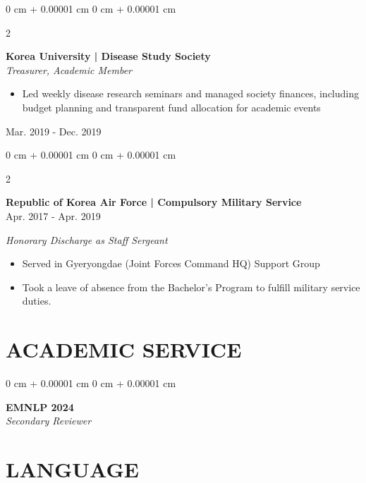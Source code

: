 \documentclass[10pt, letterpaper]{article}
\newenvironment{highlights}{
    \begin{itemize}[
        topsep=0.10 cm,
        parsep=0.10 cm,
        partopsep=0pt,
        itemsep=0pt,
        leftmargin=0 cm + 10pt
    ]
}{
    \end{itemize}
} %
\newenvironment{onecolentry}{
    \begin{adjustwidth}{
        0 cm + 0.00001 cm
    }{
        0 cm + 0.00001 cm
    }
}{
    \end{adjustwidth}
} %
\newenvironment{twocolentry}[2][]{
    \onecolentry
    \def\secondColumn{#2}
    \setcolumnwidth{\fill, 3.5 cm}
    \begin{paracol}{2}
}{
    \switchcolumn \raggedleft \secondColumn
    \end{paracol}
    \endonecolentry
} %
\begin{document}
        \begin{twocolentry}{
            Mar. 2019 - Dec. 2019\\ 
        }
        \textbf{Korea University | Disease Study Society}\\
\textit{Treasurer, Academic Member}
\begin{highlights}
    \item Led weekly disease research seminars and managed society finances, including budget planning and transparent fund allocation for academic events
\end{highlights}
        \end{twocolentry}
         \vspace{0.05 cm}
        \begin{twocolentry}{
            Apr. 2017 - Apr. 2019\\ 
        }
        \textbf{Republic of Korea Air Force | Compulsory Military Service}\\
        \end{twocolentry}
        \textit{Honorary Discharge as Staff Sergeant}
    \begin{highlights}
    \item Served in Gyeryongdae (Joint Forces Command HQ) Support Group
    \item Took a leave of absence from the Bachelor's Program to fulfill military service duties.
    \end{highlights}
            \vspace{0.1 cm}

    \section{ACADEMIC SERVICE}
        \vspace{0.03 cm}
    
        \begin{onecolentry}
            \textbf{EMNLP 2024} \\
            \textit{Secondary Reviewer}
        \end{onecolentry}
            \vspace{0.05 cm}
            
\section{LANGUAGE}
    
\end{document}
